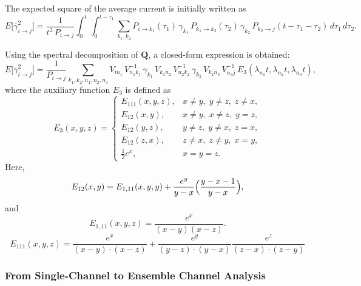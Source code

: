 \documentclass[pdflatex,sn-nature]{sn-jnl}%
\begin{document}
The expected square of the average current is initially written as
\begin{equation}
E\bigl[\overline{\gamma}_{i\rightarrow j}^2\bigr] = \frac{1}{t^2\,P_{i\rightarrow j}} \int_0^t\int_0^{t-\tau_1} \sum_{k_1,k_2} P_{i\rightarrow k_1}(\tau_1)\,\gamma_{k_1}\,P_{k_1\rightarrow k_2}(\tau_2)\,\gamma_{k_2}\,P_{k_2\rightarrow j}(t-\tau_1-\tau_2)\,d\tau_1\,d\tau_2.
\label{eq:expected_square_integral_short}
\end{equation}

Using the spectral decomposition of \(\mathbf{Q}\), a closed-form expression is obtained:
	\begin{equation}
	E\bigl[\overline{\gamma}_{i\rightarrow j}^2\bigr] = \frac{1}{P_{i\rightarrow j}} \sum_{k_1,k_2,n_1,n_2,n_3} V_{i n_1}\,V^{-1}_{n_1 k_1}\,\gamma_{k_1}\,V_{k_1 n_2}\,V^{-1}_{n_2 k_2}\,\gamma_{k_2}\,V_{k_2 n_3}\,V^{-1}_{n_3 j}\,E_3(\lambda_{n_1}t,\lambda_{n_2}t,\lambda_{n_3}t),
\label{eq:expected_square_closed_short}
\end{equation}
where the auxiliary function \(E_3\) is defined as
\begin{equation}
E_3(x,y,z)= 
\begin{cases}
E_{111}(x,y,z), & x\neq y,\; y\neq z,\; z\neq x,\\[1mm]
E_{12}(x,y),   & x\neq y,\; x\neq z,\; y=z,\\[1mm]
	E_{12}(y,z),   & y\neq z,\; y\neq x,\; z=x,\\[1mm]
	E_{12}(z,x),   & z\neq x,\; z\neq y,\; x=y,\\[1mm]
\frac{1}{2}e^x, & x=y=z.
\end{cases}
\label{eq:E3_short}
\end{equation}
Here,
	\begin{equation}
	E_{12}(x,y)= E_{1,11}(x,y,y) + \frac{e^y}{y-x}\Bigl(\frac{y-x-1}{y-x}\Bigr),
		\label{eq:E12_short}
		\end{equation}
		and
		\begin{equation}
		E_{1,11}(x,y,z)= \frac{e^x}{(x-y)(x-z)}.
	\label{eq:E1_11_short}
	\end{equation}
\begin{equation}
	E_{111}(x,y,z)= \frac{e^x}{(x-y)\cdot (x-z)} +\frac{e^y}{(y-z)\cdot (y-x)} \frac{e^z}{(z-x)\cdot (z-y)} 
    \label{eq:E111_short}
\end{equation}
\subsubsection{From Single-Channel to Ensemble Channel Analysis}
\end{document}
